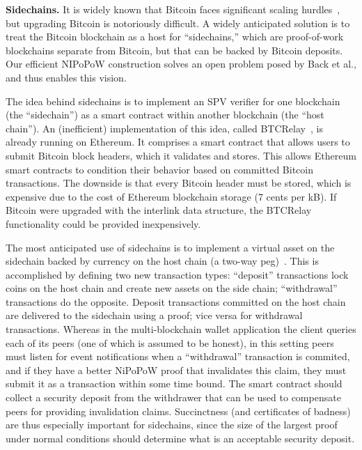 \noindent
\textbf{Sidechains.}
\label{sec.sidechains}
It is widely known that Bitcoin faces significant scaling
hurdles~\cite{onscaling}, but upgrading Bitcoin is notoriously difficult. A
widely anticipated solution is to treat the Bitcoin blockchain as a host for
``sidechains,'' which are proof-of-work blockchains separate from Bitcoin, but
that can be backed by Bitcoin deposits. Our efficient NIPoPoW construction
solves an open problem posed by Back et al., and thus enables this vision.

The idea behind sidechains is to implement an SPV verifier for one blockchain
(the ``sidechain'') as a smart contract within another blockchain (the ``host
chain''). An (inefficient) implementation of this idea, called
BTCRelay~\cite{ethereum}, is already running on Ethereum. It comprises a
smart contract that allows users to submit Bitcoin block headers, which it validates and
stores. This allows Ethereum smart contracts to condition their behavior based
on committed Bitcoin transactions. The downside is that every Bitcoin header must be
stored, which is expensive due to the cost of Ethereum blockchain storage (7 cents per kB). If
Bitcoin were upgraded with the interlink data structure, the BTCRelay
functionality could be provided inexpensively.

The most anticipated use of sidechains is to implement a virtual asset on the
sidechain backed by currency on the host chain (a two-way
peg)~\cite{sidechains}. This is accomplished by defining two new transaction
types: ``deposit'' transactions lock coins on the host chain and create new
assets on the side chain; ``withdrawal'' transactions do the opposite. Deposit
transactions committed on the host chain are delivered to the sidechain using a proof; vice versa for withdrawal transactions. Whereas in the multi-blockchain wallet application the client queries each of its peers (one of which is assumed to be honest), in this setting peers must listen for event notifications when a ``withdrawal'' transaction is commited, and if they have a better NiPoPoW proof that invalidates this claim, they must submit it as a transaction within some time bound. The smart contract should collect a security deposit from the withdrawer that can be used to compensate peers for providing invalidation claims. Succinctness (and certificates of badness) are thus especially important for sidechains, since the size of the largest proof under normal conditions should determine what is an acceptable security deposit.
